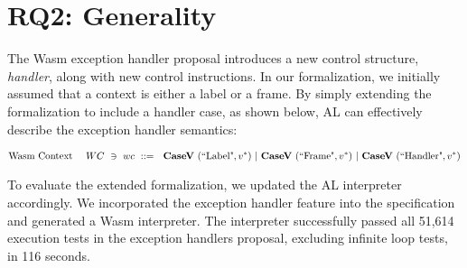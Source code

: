 \section{RQ2: Generality}
The Wasm exception handler proposal introduces a new control structure,
\textit{handler}, along with new control instructions.
In our formalization, we initially assumed that a context is either a label or
a frame.
By simply extending the formalization to include a handler case, as shown
below, AL can effectively describe the exception handler semantics:

\begin{align*}
%
  \text{Wasm Context}\quad ~ WC ~\ni~ wc ~::=~
    ~ \casev ~ (\text{``Label"}, \seq v)
    ~ | ~ \casev ~ (\text{``Frame"}, \seq v)
    ~ | ~ \casev ~ (\text{``Handler"}, \seq v) \\
\end{align*}

To evaluate the extended formalization, we updated the AL interpreter
accordingly.
We incorporated the exception handler feature into the specification and
generated a Wasm interpreter.
The interpreter successfully passed all 51,614 execution tests in the exception handlers
proposal, excluding infinite loop tests, in 116 seconds.

